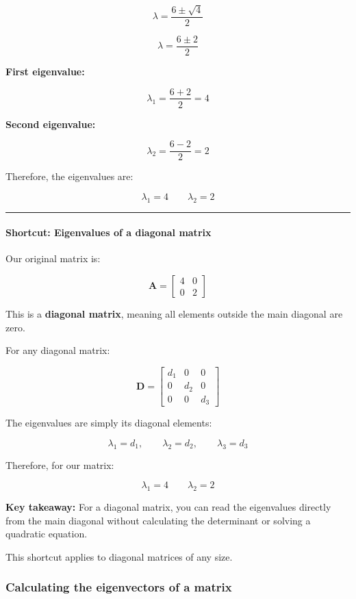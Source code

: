 \documentclass[11pt]{article}
\begin{document}
\[
\lambda =
\frac{6 \pm \sqrt{4}}{2}
\]

\[
\lambda =
\frac{6 \pm 2}{2}
\]

\textbf{First eigenvalue:}

\[
\lambda_1 = \frac{6+2}{2} = 4
\]

\textbf{Second eigenvalue:}

\[
\lambda_2 = \frac{6-2}{2} = 2
\]

Therefore, the eigenvalues are:

\[
\boxed{\lambda_1 = 4 \qquad \lambda_2 = 2}
\]

\begin{center}\rule{0.5\linewidth}{0.5pt}\end{center}

\paragraph{Shortcut: Eigenvalues of a diagonal
matrix}\label{shortcut-eigenvalues-of-a-diagonal-matrix}

Our original matrix is:

\[
\mathbf{A} =
\begin{bmatrix}
4 & 0 \\
0 & 2
\end{bmatrix}
\]

This is a \textbf{diagonal matrix}, meaning all elements outside the
main diagonal are zero.

For any diagonal matrix:

\[
\mathbf{D} =
\begin{bmatrix}
d_1 & 0 & 0 \\
0 & d_2 & 0 \\
0 & 0 & d_3
\end{bmatrix}
\]

The eigenvalues are simply its diagonal elements:

\[
\lambda_1 = d_1, \qquad
\lambda_2 = d_2, \qquad
\lambda_3 = d_3
\]

Therefore, for our matrix:

\[
\boxed{\lambda_1 = 4 \qquad \lambda_2 = 2}
\]

\textbf{Key takeaway:} For a diagonal matrix, you can read the
eigenvalues directly from the main diagonal without calculating the
determinant or solving a quadratic equation.

This shortcut applies to diagonal matrices of any size.

\subsubsection{Calculating the eigenvectors of a
matrix}\label{calculating-the-eigenvectors-of-a-matrix}
\end{document}
